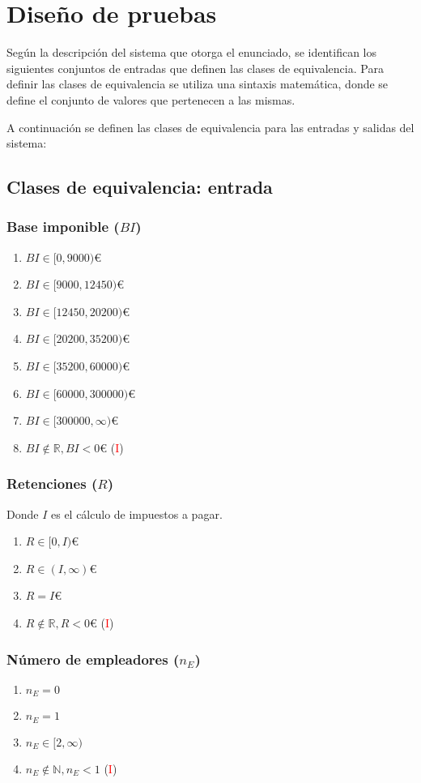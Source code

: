 \chapter{Diseño de pruebas}
Según la descripción del sistema que otorga el enunciado, se identifican los siguientes conjuntos de entradas
que definen las clases de equivalencia. Para definir las clases de equivalencia se utiliza una sintaxis
matemática, donde se define el conjunto de valores que pertenecen a las mismas.

A continuación se definen las clases de equivalencia para las entradas y salidas del sistema:

\section{Clases de equivalencia: entrada}
\subsection{Base imponible ($BI$)}
\begin{enumerate}
	\item $BI \in [0, 9000)$€
	\item $BI \in [9000, 12450)$€
	\item $BI \in [12450, 20200)$€
	\item $BI \in [20200, 35200)$€
	\item $BI \in [35200, 60000)$€
	\item $BI \in [60000, 300000)$€
	\item $BI \in [300000, \infty)$€
	\item $BI \notin \mathbb{R}, BI < 0$€ (\textcolor{red}{I})
\end{enumerate}

\subsection{Retenciones ($R$)}
Donde $I$ es el cálculo de impuestos a pagar.

\begin{enumerate}
	\item $R \in [0, I)$€
	\item $R \in (I, \infty)$€
	\item $R = I$€
	\item $R \notin \mathbb{R}, R < 0$€ (\textcolor{red}{I})
\end{enumerate}

\subsection{Número de empleadores ($n_{E}$)}
\begin{enumerate}
	\item $n_{E} = 0$
	\item $n_{E} = 1$
	\item $n_{E} \in [2, \infty)$
	\item $n_{E} \notin \mathbb{N}, n_{E} < 1$ (\textcolor{red}{I})
\end{enumerate}


